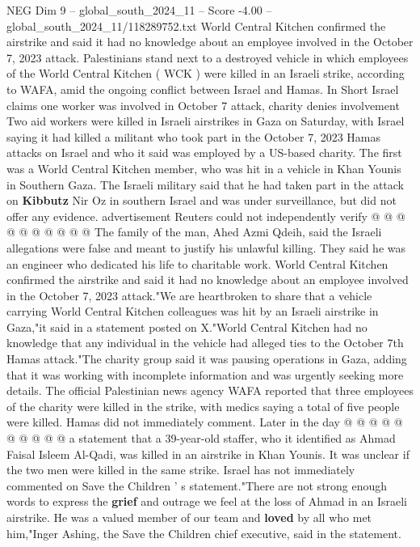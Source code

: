 \begin{textsample}{NEG Dim 9 – global\_south\_2024\_11 – Score -4.00 – global\_south\_2024\_11/118289752.txt}  \label{ex:f9_neg_415}
World Central Kitchen confirmed the airstrike and said it had no knowledge about an employee involved in the October 7, 2023 attack.
Palestinians stand next to a destroyed vehicle in which employees of the World Central Kitchen ( WCK ) were killed in an Israeli strike, according to WAFA, amid the ongoing conflict between Israel and Hamas.
In Short Israel claims one worker was involved in October 7 attack, charity denies involvement Two aid workers were killed in Israeli airstrikes in Gaza on Saturday, with Israel saying it had killed a militant who took part in the October 7, 2023 Hamas attacks on Israel and who it said was employed by a US-based charity.
The first was a World Central Kitchen member, who was hit in a vehicle in Khan Younis in Southern Gaza.
The Israeli military said that he had taken part in the attack on \textbf{Kibbutz} Nir Oz in southern Israel and was under surveillance, but did not offer any evidence. advertisement Reuters could not independently verify @ @ @ @ @ @ @ @ @ @ The family of the man, Ahed Azmi Qdeih, said the Israeli allegations were false and meant to justify his unlawful killing.
They said he was an engineer who dedicated his life to charitable work.
World Central Kitchen confirmed the airstrike and said it had no knowledge about an employee involved in the October 7, 2023 attack."We are heartbroken to share that a vehicle carrying World Central Kitchen colleagues was hit by an Israeli airstrike in Gaza,"it said in a statement posted on X."World Central Kitchen had no knowledge that any individual in the vehicle had alleged ties to the October 7th Hamas attack."The charity group said it was pausing operations in Gaza, adding that it was working with incomplete information and was urgently seeking more details.
The official Palestinian news agency WAFA reported that three employees of the charity were killed in the strike, with medics saying a total of five people were killed.
Hamas did not immediately comment.
Later in the day @ @ @ @ @ @ @ @ @ @ a statement that a 39-year-old staffer, who it identified as Ahmad Faisal Isleem Al-Qadi, was killed in an airstrike in Khan Younis.
It was unclear if the two men were killed in the same strike.
Israel has not immediately commented on Save the Children ' s statement."There are not strong enough words to express the \textbf{grief} and outrage we feel at the loss of Ahmad in an Israeli airstrike.
He was a valued member of our team and \textbf{loved} by all who met him,"Inger Ashing, the Save the Children chief executive, said in the statement.

\end{textsample}
